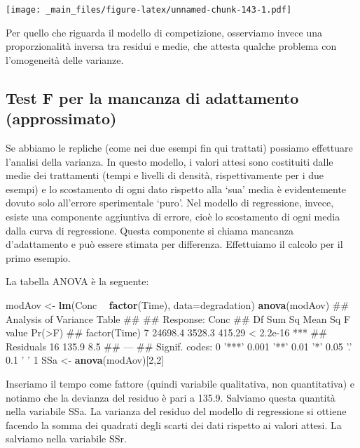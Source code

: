 \documentclass[a4paper,12pt,oneside]{book}
\newenvironment{Shaded}{\begin{snugshade}}{\end{snugshade}}
\newcommand{\KeywordTok}[1]{\textcolor[rgb]{0.13,0.29,0.53}{\textbf{#1}}}
\newcommand{\DataTypeTok}[1]{\textcolor[rgb]{0.13,0.29,0.53}{#1}}
\newcommand{\DecValTok}[1]{\textcolor[rgb]{0.00,0.00,0.81}{#1}}
\newcommand{\StringTok}[1]{\textcolor[rgb]{0.31,0.60,0.02}{#1}}
\newcommand{\OperatorTok}[1]{\textcolor[rgb]{0.81,0.36,0.00}{\textbf{#1}}}
\newcommand{\NormalTok}[1]{#1}
\theoremstyle{definition}
\theoremstyle{definition}
\theoremstyle{definition}
\theoremstyle{remark}
\begin{document}
\texttt{[image: \_main\_files/figure-latex/unnamed-chunk-143-1.pdf]}

Per quello che riguarda il modello di competizione, osserviamo invece
una proporzionalità inversa tra residui e medie, che attesta qualche
problema con l'omogeneità delle varianze.

\subsection{Test F per la mancanza di adattamento
(approssimato)}\label{test-f-per-la-mancanza-di-adattamento-approssimato}

Se abbiamo le repliche (come nei due esempi fin qui trattati) possiamo
effettuare l'analisi della varianza. In questo modello, i valori attesi
sono costituiti dalle medie dei trattamenti (tempi e livelli di densità,
rispettivamente per i due esempi) e lo scostamento di ogni dato rispetto
alla `sua' media è evidentemente dovuto solo all'errore sperimentale
`puro'. Nel modello di regressione, invece, esiste una componente
aggiuntiva di errore, cioè lo scostamento di ogni media dalla curva di
regressione. Questa componente si chiama mancanza d'adattamento e può
essere stimata per differenza. Effettuiamo il calcolo per il primo
esempio.

La tabella ANOVA è la seguente:

\begin{Shaded}
\begin{Highlighting}[]
\NormalTok{modAov <-}\StringTok{ }\KeywordTok{lm}\NormalTok{(Conc }\OperatorTok{~}\StringTok{ }\KeywordTok{factor}\NormalTok{(Time), }\DataTypeTok{data=}\NormalTok{degradation)}
\KeywordTok{anova}\NormalTok{(modAov)}
\NormalTok{## Analysis of Variance Table}
\NormalTok{## }
\NormalTok{## Response: Conc}
\NormalTok{##              Df  Sum Sq Mean Sq F value    Pr(>F)    }
\NormalTok{## factor(Time)  7 24698.4  3528.3  415.29 < 2.2e-16 ***}
\NormalTok{## Residuals    16   135.9     8.5                      }
\NormalTok{## ---}
\NormalTok{## Signif. codes:  0 '***' 0.001 '**' 0.01 '*' 0.05 '.' 0.1 ' ' 1}
\NormalTok{SSa <-}\StringTok{ }\KeywordTok{anova}\NormalTok{(modAov)[}\DecValTok{2}\NormalTok{,}\DecValTok{2}\NormalTok{]}
\end{Highlighting}
\end{Shaded}

Inseriamo il tempo come fattore (quindi variabile qualitativa, non
quantitativa) e notiamo che la devianza del residuo è pari a 135.9.
Salviamo questa quantità nella variabile SSa. La varianza del residuo
del modello di regressione si ottiene facendo la somma dei quadrati
degli scarti dei dati rispetto ai valori attesi. La salviamo nella
variabile SSr.
\end{document}
